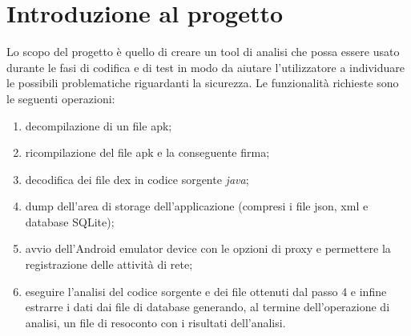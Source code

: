 
\section{Introduzione al progetto}\label{sec:introduzione-al-progetto}
Lo scopo del progetto è quello di creare un tool di analisi che possa essere usato durante le fasi di codifica e di test in modo da aiutare l'utilizzatore a individuare le possibili problematiche riguardanti la sicurezza.
Le funzionalità richieste sono le seguenti operazioni:
\begin{enumerate}
    \item decompilazione di un file apk;
    \item ricompilazione del file apk e la conseguente firma;
    \item decodifica dei file \gls{dex} in codice sorgente \textit{java};
    \item dump dell'area di storage dell'applicazione (compresi i file json, xml e database SQLite);
    \item avvio dell'Android emulator device con le opzioni di proxy e permettere la registrazione delle attività di rete;
    \item eseguire l'analisi del codice sorgente e dei file ottenuti dal passo 4 e infine estrarre i dati dai file di database generando, al termine dell'operazione di analisi, un file di resoconto con i risultati dell'analisi.
\end{enumerate}